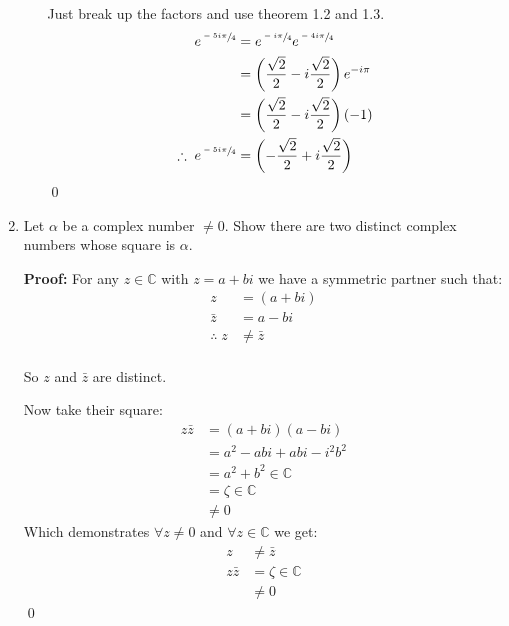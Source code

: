 \begin{enumerate}
\begin{enumerate}
		            Just break up the factors and use theorem 1.2 and 1.3.
		            \begin{align*}
			            e^{\sfrac{-5i\pi}{4}}
			             & = e^{\sfrac{-i\pi}{4}} e^{\sfrac{-4i\pi}{4}}                        \\
			             & = \left( \frac{\sqrt{2}}{2} - i\frac{\sqrt{2}}{2} \right) e^{-i\pi} \\
			             & = \left( \frac{\sqrt{2}}{2} - i\frac{\sqrt{2}}{2} \right) (-1)      \\
			            \therefore \; e^{\sfrac{-5i\pi}{4}}
			             & = \left( -\frac{\sqrt{2}}{2} + i\frac{\sqrt{2}}{2} \right)          \\
		            \end{align*}
		            \qed
	      \end{enumerate}

	\item Let $\alpha$ be a complex number $\neq 0.$ Show there are two distinct complex numbers whose
	      square is $\alpha.$

	      \textbf{Proof:}
	      For any $z \in \mathbb{C}$ with $z = a + bi$ we have a symmetric partner such that:
	      \begin{align*}
		      z               & = (a + bi)   \\
		      \bar{z}         & = a - bi     \\
		      \therefore \; z & \neq \bar{z} \\
	      \end{align*}

	      So $z$ and $\bar{z}$ are distinct.

	      Now take their square:
	      \begin{align*}
		      z \bar{z} & = (a + bi)(a - bi)         \\
		                & = a^2 -abi +abi -i^2 b^2   \\
		                & = a^2 + b^2 \in \mathbb{C} \\
		                & = \zeta \in \mathbb{C}     \\
		                & \neq 0
	      \end{align*}
	      Which demonstrates $\forall z \neq 0$ and $\forall z \in \mathbb{C}$ we get:
	      \begin{align*}
		      z         & \neq \bar{z}           \\
		      z \bar{z} & = \zeta \in \mathbb{C} \\
		                & \neq 0
	      \end{align*}
	      \qed


\end{enumerate}
